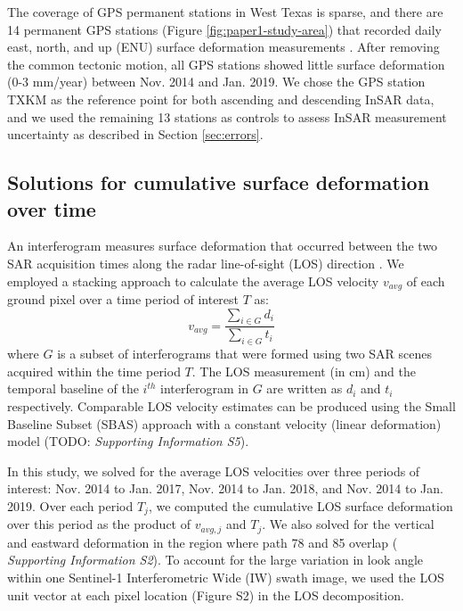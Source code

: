 \documentclass{utexasthesis}
\begin{document}
The coverage of GPS permanent stations in West Texas is sparse, and there are 14 permanent GPS stations (Figure \ref{fig:paper1-study-area}) that recorded daily east, north, and up (ENU) surface deformation measurements \citep{Blewitt2018HarnessingGpsData}. After removing the common tectonic motion, all GPS stations showed little surface deformation (0-3 mm/year) between Nov. 2014 and Jan. 2019. We chose the GPS station TXKM as the reference point for both ascending and descending InSAR data, and we used the remaining 13 stations as controls to assess InSAR measurement uncertainty as described in Section \ref{sec:errors}.

\subsection{Solutions for cumulative surface deformation over time}
\label{sec:stacking}
An interferogram measures surface deformation that occurred between the two SAR acquisition times along the radar line-of-sight (LOS) direction \citep{Hanssen2001RadarInterferometryData}. We employed a stacking approach \citep{Sandwell1998PhaseGradientApproach} to calculate the average LOS velocity $v_{avg}$ of each ground pixel over a time period of interest $T$ as:
\begin{equation}
	v_{avg} = \frac{\sum_{i \in G} d_i}{\sum_{i \in G} t_i}
	\label{eq:stacking}
\end{equation}
where $G$ is a subset of interferograms that were formed using two SAR scenes acquired within the time period $T$. The LOS measurement (in cm) and the temporal baseline of the $i^{th}$ interferogram in $G$ are written as $d_i$ and $ t_i $ respectively. Comparable LOS velocity estimates can be produced using the Small Baseline Subset (SBAS) approach \citep{Berardino2002NewAlgorithmSurface} with a constant velocity (linear deformation) model (TODO: \textit{Supporting Information S5}).

In this study, we solved for the average LOS velocities over three periods of interest: Nov. 2014 to Jan. 2017, Nov. 2014 to Jan. 2018, and Nov. 2014 to Jan. 2019. Over each period $T_j$, we computed the cumulative LOS surface deformation over this period as the product of $v_{avg,j}$ and $T_j$. We also solved for the vertical and eastward deformation in the region where path 78 and 85 overlap ( \textit{Supporting Information S2}). To account for the large variation in look angle within one Sentinel-1 Interferometric Wide (IW) swath image, we used the LOS unit vector at each pixel location (Figure S2) in the LOS decomposition.
\end{document}
